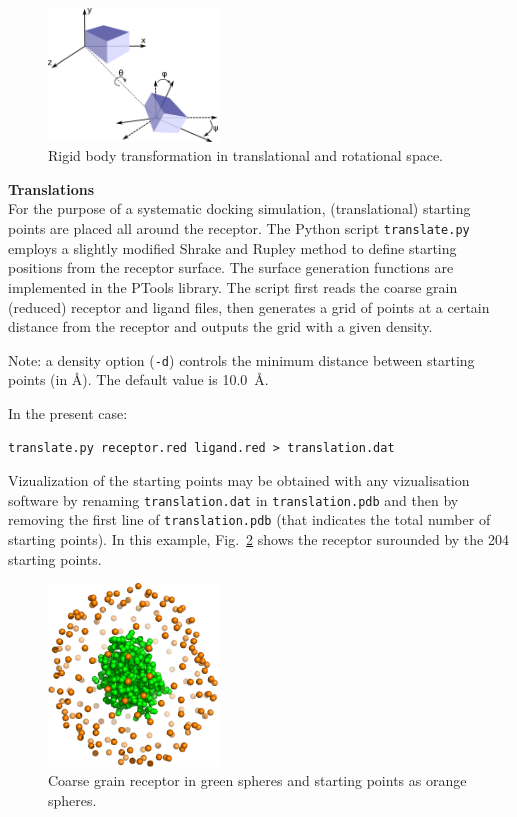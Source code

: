 \documentclass[12pt,a4paper]{article}
\begin{document}
\begin{figure}[!htbp]
\center
\includegraphics*[width=0.4\textwidth]{img/rigid_body_freedom.png}
\caption{Rigid body transformation in translational and rotational space.}
\label{rigid_body}
\end{figure}



\textbf{Translations}\\
For the purpose of a systematic docking simulation, (translational) 
starting points are placed  all around the
receptor. The Python script {\tt translate.py} employs a slightly modified
Shrake and Rupley \cite{Shrake1973} method to define starting positions
from the receptor surface. The surface generation functions are implemented in
the PTools library. The script first reads the coarse grain (reduced)
receptor and ligand files, then generates a grid of points at a certain
distance from the receptor and outputs the grid with a given density.

Note: a density option ({\tt -d}) controls the minimum distance between starting
points (in \AA). The default value is 10.0~\AA. 

In the present case:
\begin{verbatim}
translate.py receptor.red ligand.red > translation.dat
\end{verbatim}

Vizualization of the starting points may be obtained with any vizualisation 
software by renaming {\tt translation.dat} in {\tt translation.pdb} and then
by removing the first line of {\tt translation.pdb} (that indicates the total 
number of starting points). In this example, Fig.~\ref{1CGI_translation} shows
the receptor surounded by the 204 starting points.

\begin{figure}[htbp]
\center
\includegraphics*[width=0.4\textwidth]{img/1CGI_translation.png}
\caption{Coarse grain receptor in green spheres and starting points as orange spheres.}
\label{1CGI_translation}
\end{figure}
\end{document}
